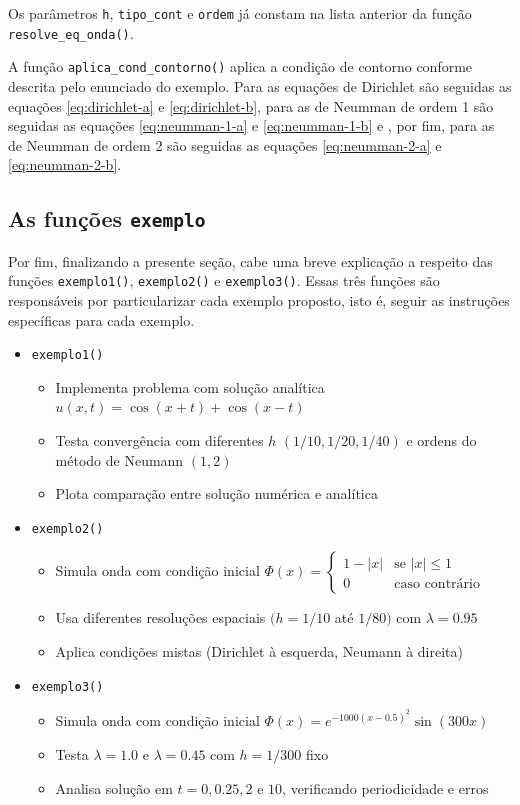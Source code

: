 \documentclass[column,amsmath,amssymb,floatfix]{revtex4}
\begin{document}
Os parâmetros \texttt{h}, \texttt{tipo\_cont} e \texttt{ordem} já constam na lista anterior da função \texttt{resolve\_eq\_onda()}.

A função \texttt{aplica\_cond\_contorno()} aplica a condição de contorno conforme descrita pelo enunciado do exemplo. Para as equações de Dirichlet são seguidas as equações \eqref{eq:dirichlet-a} e \eqref{eq:dirichlet-b}, para as de Neumman de ordem 1 são seguidas as equações \eqref{eq:neumman-1-a} e \eqref{eq:neumman-1-b} e , por fim, para as de Neumman de ordem 2 são seguidas as equações \eqref{eq:neumman-2-a} e \eqref{eq:neumman-2-b}.

\subsection{As funções \texttt{exemplo}}
Por fim, finalizando a presente seção, cabe uma breve explicação a respeito das funções \texttt{exemplo1()}, \texttt{exemplo2()} e \texttt{exemplo3()}. Essas três funções são responsáveis por particularizar cada exemplo proposto, isto é, seguir as instruções específicas para cada exemplo.
\begin{itemize}
	\item \texttt{exemplo1()}
	      \begin{itemize}
	      	\item Implementa problema com solução analítica $u(x,t) = \cos(x+t) + \cos(x-t)$
	      	\item Testa convergência com diferentes $h$ $(1/10, 1/20, 1/40)$ e ordens do método de Neumann $(1,2)$
	      	\item Plota comparação entre solução numérica e analítica
	      \end{itemize}
	      	      	      
	\item \texttt{exemplo2()}
	      \begin{itemize}
	      	\item Simula onda com condição inicial $\Phi(x) = \begin{cases} 1-|x| & \text{se } |x|\leq1 \\ 0 & \text{caso contrário} \end{cases}$
	      	\item Usa diferentes resoluções espaciais $(h = 1/10$ até $1/80)$ com $\lambda=0.95$
	      	\item Aplica condições mistas (Dirichlet à esquerda, Neumann à direita)
	      \end{itemize}
	      	      	      
	\item \texttt{exemplo3()}
	      \begin{itemize}
	      	\item Simula onda com condição inicial $\Phi(x) = e^{-1000(x-0.5)^2}\sin(300x)$
	      	\item Testa $\lambda = 1.0$ e $\lambda = 0.45$ com $h=1/300$ fixo
	      	\item Analisa solução em $t=0, 0.25, 2$ e $10$, verificando periodicidade e erros
	      \end{itemize}
\end{itemize}
\newpage
\end{document}
